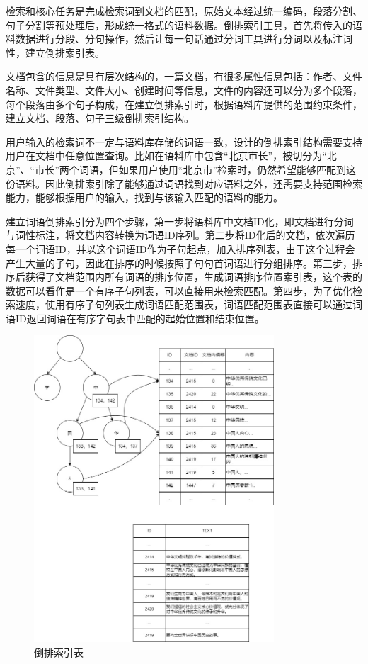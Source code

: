 \documentclass[11pt]{article}
\begin{document}
\begin{CJK*}{UTF8}{gbsn}
检索和核心任务是完成检索词到文档的匹配，原始文本经过统一编码，段落分割、句子分割等预处理后，形成统一格式的语料数据。倒排索引工具，首先将传入的语料数据进行分段、分句操作，然后让每一句话通过分词工具进行分词以及标注词性，建立倒排索引表。

文档包含的信息是具有层次结构的，一篇文档，有很多属性信息包括：作者、文件名称、文件类型、文件大小、创建时间等信息，文件的内容还可以分为多个段落，每个段落由多个句子构成，在建立倒排索引时，根据语料库提供的范围约束条件，建立文档、段落、句子三级倒排索引结构。

用户输入的检索词不一定与语料库存储的词语一致，设计的倒排索引结构需要支持用户在文档中任意位置查询。比如在语料库中包含“北京市长”，被切分为“北京”、“市长”两个词语，但如果用户使用“北京市”检索时，仍然希望能够匹配到这份语料。因此倒排索引除了能够通过词语找到对应语料之外，还需要支持范围检索能力，能够根据用户的输入，找到与该输入匹配的语料的能力。

建立词语倒排索引分为四个步骤，第一步将语料库中文档ID化，即文档进行分词与词性标注，将文档内容转换为词语ID序列。第二步将ID化后的文档，依次遍历每一个词语ID，并以这个词语ID作为子句起点，加入排序列表，由于这个过程会产生大量的子句，因此在排序的时候按照子句句首词语进行分组排序。第三步，排序后获得了文档范围内所有词语的排序位置，生成词语排序位置索引表，这个表的数据可以看作是一个有序子句列表，可以直接用来检索匹配。第四步，为了优化检索速度，使用有序子句列表生成词语匹配范围表，词语匹配范围表直接可以通过词语ID返回词语在有序字句表中匹配的起始位置和结束位置。

\begin{figure}[!h]
	\centering
	\includegraphics[width=0.8\textwidth]{image/daopaibiao.jpg}
	\caption{倒排索引表}
	\label{fig:daopaibiao}
\end{figure}


\end{CJK*}
\end{document}
